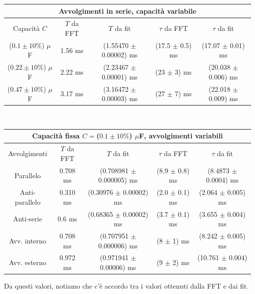 \documentclass{article}[a4paper, oneside,11pt]
\begin{document}
\begin{center}
    \begin{tabular}{|c||c|c||c|c|}
    \hline
    \multicolumn{5}{|c|}{Avvolgimenti in serie, capacità variabile}\\
    \hline
        Capacità $C$ & $T$ da FFT & $T$ da fit & $\tau$ da FFT & $\tau$ da fit\\
    \hline\hline
        ($0.1  \pm 10 \%$) $\mu$F & 1.56 ms & (1.55470 $\pm$ 0.00002) ms & (17.5 $\pm$ 0.5) ms & (17.07 $\pm$ 0.01) ms\\
    \hline
        ($0.22 \pm 10 \%$) $\mu$F & 2.22 ms & (2.23467 $\pm$ 0.00001) ms & (23 $\pm$ 3) ms & (20.038 $\pm$ 0.006) ms\\
    \hline
        ($0.47 \pm 10 \%$) $\mu$F & 3.17 ms & (3.16472 $\pm$ 0.00003) ms & (27 $\pm$ 7) ms & (22.018 $\pm$ 0.009) ms\\
    \hline
    \end{tabular}
    \\\quad
    \newline
    \begin{tabular}{|c||c|c||c|c|}
    \hline
    \multicolumn{5}{|c|}{Capacità fissa $C = $($0.1  \pm 10 \%$) $\mu$F, avvolgimenti variabili}\\
    \hline
        Avvolgimenti & $T$ da FFT & $T$ da fit & $\tau$ da FFT & $\tau$ da fit\\
    \hline\hline
        Parallelo & 0.708 ms & (0.708981 $\pm$ 0.000005) ms & (8.9 $\pm$ 0.8) ms & (8.4873 $\pm$ 0.0004) ms\\
    \hline
        Anti-parallelo & 0.310 ms & (0.30976 $\pm$ 0.00002) ms & (2.0 $\pm$ 0.1) ms & (2.064 $\pm$ 0.005) ms\\
    \hline
        Anti-serie & 0.6 ms & (0.68365 $\pm$ 0.00002) ms & (3.7 $\pm$ 0.1) ms & (3.655 $\pm$ 0.004) ms\\
    \hline
        Avv. interno & 0.708 ms & (0.707951 $\pm$ 0.000006) ms & (8 $\pm$ 1) ms & (8.242 $\pm$ 0.005) ms\\
    \hline
        Avv. esterno & 0.972 ms & (0.971941 $\pm$ 0.00006) ms & (9 $\pm$ 2) ms & (10.761 $\pm$ 0.004) ms\\
    \hline
    \end{tabular}
\end{center}
Da questi valori, notiamo che c'è accordo tra i valori ottenuti dalla FFT e dai fit. 
\end{document}
